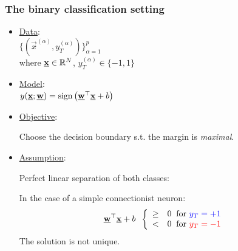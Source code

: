 \begin{frame}\frametitle{The binary classification setting}



\begin{itemize}
	\item \underline{Data}:\\[2mm]
	$
	\Big\{ \left(\vec x^{(\alpha)}, y^{(\alpha)}_{T} \right) \Big\}_{\alpha=1}^{p}\,
	$\\[2mm]
	where $\vec x \in \R^{N}$, $y_T^{(\alpha)} \in \{-1, 1\}$\\

	\item \underline{Model}:\\[2mm]
	$
	y(\vec x; \vec w) = \sign \big( \vec w^{\top} \vec x + b \big)
	$
    
    \item \underline{Objective}:
    
    Choose the decision boundary s.t. the margin is \emph{maximal}.
    
    \item \underline{Assumption}:
    
    Perfect linear separation of both classes:
    
    In the case of a simple connectionist neuron:
    \begin{equation}
    \vec w^{\top} \vec x + b \;\;
    \left \{ \begin{array}{ll}
					\ge& 0 \;\;\text{for } {\color{blue}y_{T} = +1}\\
					<& 0 \;\;\text{for } {\color{red}y_{T} = -1}
				\end{array} \right.  
    \end{equation}
    The solution is not unique.
    
\end{itemize}
    
\end{frame}

